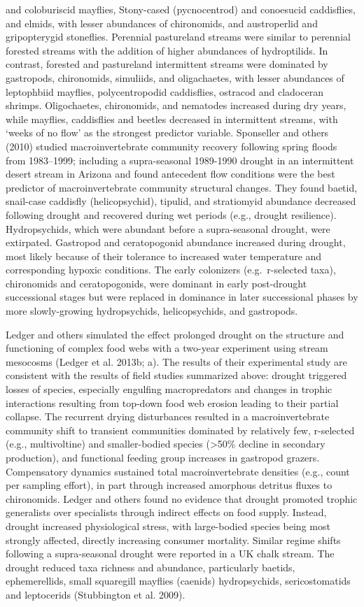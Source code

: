 \documentclass[12pt,twoside]{reedthesis}
\theoremstyle{definition}
\theoremstyle{definition}
\theoremstyle{definition}
\theoremstyle{remark}
\begin{document}
and coloburiscid mayflies, Stony-cased (pycnocentrod) and conoesucid
caddisflies, and elmids, with lesser abundances of chironomids, and
austroperlid and gripopterygid stoneflies. Perennial pastureland streams
were similar to perennial forested streams with the addition of higher
abundances of hydroptilids. In contrast, forested and pastureland
intermittent streams were dominated by gastropods, chironomids,
simuliids, and oligachaetes, with lesser abundances of leptophbiid
mayflies, polycentropodid caddisflies, ostracod and cladoceran shrimps.
Oligochaetes, chironomids, and nematodes increased during dry years,
while mayflies, caddisflies and beetles decreased in intermittent
streams, with `weeks of no flow' as the strongest predictor variable.
Sponseller and others (2010) studied macroinvertebrate community
recovery following spring floods from 1983--1999; including a
supra-seasonal 1989-1990 drought in an intermittent desert stream in
Arizona and found antecedent flow conditions were the best predictor of
macroinvertebrate community structural changes. They found baetid,
snail-case caddisfly (helicopsychid), tipulid, and stratiomyid abundance
decreased following drought and recovered during wet periods (e.g.,
drought resilience). Hydropsychids, which were abundant before a
supra-seasonal drought, were extirpated. Gastropod and ceratopogonid
abundance increased during drought, most likely because of their
tolerance to increased water temperature and corresponding hypoxic
conditions. The early colonizers (e.g.~r-selected taxa), chironomids and
ceratopogonids, were dominant in early post-drought successional stages
but were replaced in dominance in later successional phases by more
slowly-growing hydropsychids, helicopsychids, and gastropods.

Ledger and others simulated the effect prolonged drought on the
structure and functioning of complex food webs with a two-year
experiment using stream mesocosms (Ledger et al. 2013b; a). The results
of their experimental study are consistent with the results of field
studies summarized above: drought triggered losses of species,
especially engulfing macropredators and changes in trophic interactions
resulting from top-down food web erosion leading to their partial
collapse. The recurrent drying disturbances resulted in a
macroinvertebrate community shift to transient communities dominated by
relatively few, r-selected (e.g., multivoltine) and smaller-bodied
species (\textgreater{}50\% decline in secondary production), and
functional feeding group increases in gastropod grazers. Compensatory
dynamics sustained total macroinvertebrate densities (e.g., count per
sampling effort), in part through increased amorphous detritus fluxes to
chironomids. Ledger and others found no evidence that drought promoted
trophic generalists over specialists through indirect effects on food
supply. Instead, drought increased physiological stress, with
large-bodied species being most strongly affected, directly increasing
consumer mortality. Similar regime shifts following a supra-seasonal
drought were reported in a UK chalk stream. The drought reduced taxa
richness and abundance, particularly baetids, ephemerellids, small
squaregill mayflies (caenids) hydropsychids, sericostomatids and
leptocerids (Stubbington et al. 2009).
\end{document}
